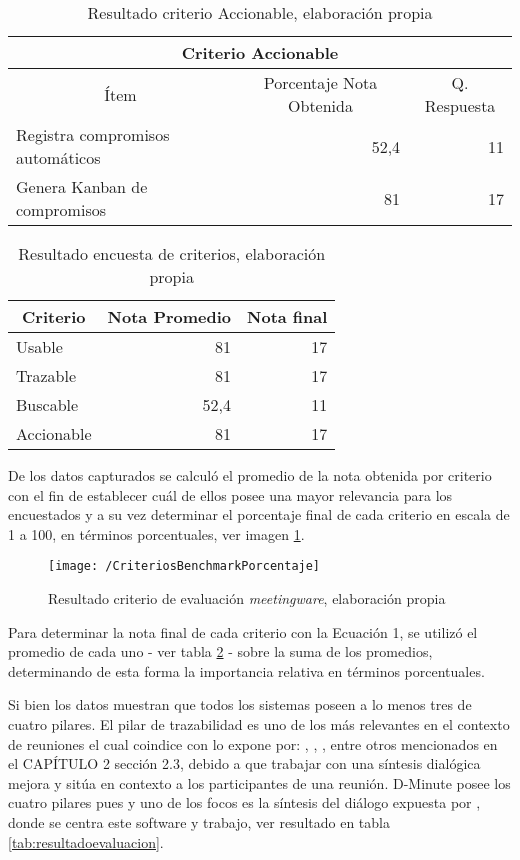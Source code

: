 \begin{table}[!h]
\centering
\caption{Resultado criterio Accionable, elaboración propia}
\label{tab:accionable}
\begin{tabular}{|l|r|r|}
\hline
\multicolumn{3}{|c|}{Criterio Accionable} \\ \hline
\multicolumn{1}{|c|}{Ítem} & \multicolumn{1}{c|}{Porcentaje Nota Obtenida} & \multicolumn{1}{c|}{Q. Respuesta} \\ \hline
Registra compromisos automáticos & 52,4 & 11 \\ \hline
Genera Kanban de compromisos & 81 & 17 \\ \hline
\end{tabular}
\end{table}

\begin{table}[!h]
\centering
\caption{Resultado encuesta de criterios, elaboración propia}
\label{tab:resultado}
\begin{tabular}{|l|r|r|}
\hline
\multicolumn{1}{|c|}{Criterio} & \multicolumn{1}{c|}{Nota Promedio} & \multicolumn{1}{c|}{Nota final} \\ \hline
Usable & 81 & 17 \\ \hline
Trazable & 81 & 17 \\ \hline
Buscable & 52,4 & 11 \\ \hline
Accionable & 81 & 17 \\ \hline
\end{tabular}
\end{table}

De los datos capturados se calculó el promedio de la nota obtenida por criterio con el fin de establecer cuál de ellos posee una mayor relevancia para los encuestados y a su vez determinar el porcentaje final de cada criterio en escala de 1 a 100, en términos porcentuales, ver imagen \ref{img3-3}.


\begin{figure}[!h]
\centering
\texttt{[image: /CriteriosBenchmarkPorcentaje]}
\caption{Resultado criterio de evaluación \textit{meetingware}, elaboración propia} 
\label{img3-3}
\end{figure}

Para determinar la nota final de cada criterio con la Ecuación 1, se utilizó el promedio de cada uno - ver tabla \ref{tab:resultado} - sobre la suma de los promedios, determinando de esta forma la importancia relativa en términos porcentuales.

Si bien los datos muestran que todos los sistemas poseen a lo menos tres de cuatro pilares. El pilar de trazabilidad es uno de los más relevantes en el contexto de reuniones el cual coindice con lo expone por: , , ,  entre otros mencionados en el CAPÍTULO 2 sección 2.3, debido a que trabajar con una síntesis dialógica mejora y sitúa en contexto a los participantes de una reunión. D-Minute posee los cuatro pilares pues y uno de los focos es la síntesis del diálogo expuesta por , donde se centra este software y trabajo, ver resultado en tabla \ref{tab:resultadoevaluacion}.

